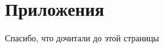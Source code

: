 \documentclass[a5paper,10pt,openany]{book}
\begin{document}
\part*{Приложения}



%

%
%
%
%
%


\begin{thebibliography}{999}

\end{thebibliography}




\newpage

\pagestyle{empty}

\clearpage
{}
\begin{center}
\begin{minipage}{\textwidth}
\begin{center}Спасибо, что дочитали до этой страницы\end{center}
\end{minipage}
\end{center}
\clearpage
\end{document}
